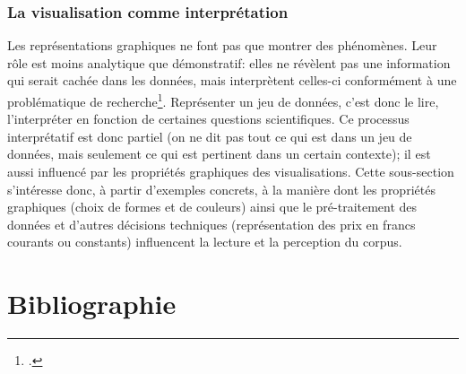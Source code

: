 \documentclass[a4paper, 12pt, twoside]{book}
\newcommand{\ktb}{\textit{Katabase}}
\newcommand{\mss}{\textit{MSS}}
\newcommand{\mssktb}{\mss{} / \ktb{}}
\begin{document}
\subsection{La visualisation comme interprétation}
Les représentations graphiques ne font pas que montrer des phénomènes. Leur rôle est moins analytique que démonstratif: elles ne révèlent pas une information qui serait cachée dans les données, mais interprètent celles-ci conformément à une problématique de recherche\footcite[p. 78]{drucker_visualisation_2020}. Représenter un jeu de données, c'est donc le lire, l'interpréter en fonction de certaines questions scientifiques. Ce processus interprétatif est donc partiel (on ne dit pas tout ce qui est dans un jeu de données, mais seulement ce qui est pertinent dans un certain contexte); il est aussi influencé par les propriétés graphiques des visualisations. Cette sous-section s'intéresse donc, à partir d'exemples concrets, à la manière dont les propriétés graphiques (choix de formes et de couleurs) ainsi que le pré-traitement des données et d'autres décisions techniques (représentation des prix en francs courants ou constants) influencent la lecture et la perception du corpus.


\pagebreak
\chapter*{Bibliographie}
\printbibliography[heading=subbibintoc,keyword={katabase},title={Projet \mssktb{}}]
\printbibliography[heading=subbibintoc,keyword={text},title={Édition numérique, traitement automatisé et analyse de texte}]
\printbibliography[heading=subbibintoc,keyword={visualisation},title={Visualisation et design d'interfaces}]
\printbibliography[heading=subbibintoc,keyword={econometrie},title={Économétrie et statistiques}]




\tableofcontents
\end{document}
